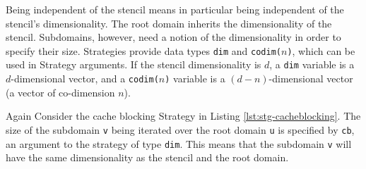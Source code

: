 Being independent of the stencil means in particular being independent of the stencil's dimensionality.
The root domain inherits the dimensionality of the stencil. Subdomains, however, need a notion of the dimensionality
in order to specify their size. Strategies provide data types \texttt{dim} and \texttt{codim($n$)}, which can be used
in Strategy arguments. If the stencil dimensionality is $d$, a \texttt{dim} variable is a $d$-dimensional vector,
and a \texttt{codim($n$)} variable is a $(d-n)$-dimensional vector (a vector of co-dimension $n$).

Again Consider the cache blocking Strategy in Listing \ref{lst:stg-cacheblocking}. The size of the subdomain \texttt{v}
being iterated over the root domain \texttt{u} is specified by \texttt{cb}, an argument to the strategy of type
\texttt{dim}. This means that the subdomain \texttt{v} will have the same dimensionality as the stencil and the
root domain.


